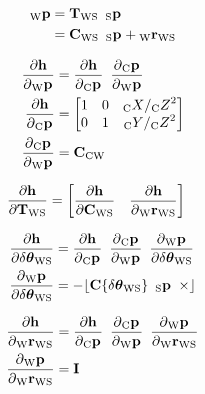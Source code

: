 \begin{align}
  \Point{\world}{\fiducial_{ij}}
  &=
    \Tf{\world}{\sensor}
    \enspace \Pt{\sensor} \\
  &=
    \Rot{\world}{\sensor}
    \enspace \Pt{\sensor}
		+ \Pos{\world}{\sensor}
\end{align}

\begin{align}
  \dfrac{\partial{\projFunc}}{\partial{\Pt{\world}}}
		&= \dfrac{\partial{\projFunc}}{\partial{\Pt{\cam}}}
			 \enspace
			 \dfrac{\partial{\Pt{\cam}}}{\partial{\Pt{\world}}} \\
  \dfrac{\partial{\projFunc}}{\partial{\Pt{\cam}}}
		&=
			\begin{bmatrix}
				1 & 0 & \KineNotationBare{X}{\cam} / \KineNotationBare{Z}{\cam}^{2} \\
				0 & 1 & \KineNotationBare{Y}{\cam} / \KineNotationBare{Z}{\cam}^{2}
			\end{bmatrix} \\
  \dfrac{\partial{\Pt{\cam}}}{\partial{\Pt{\world}}}
		&= \Rot{\cam}{\world}
\end{align}

\begin{align}
  \dfrac{\partial{\projFunc}}{\partial{\Tf{\world}{\sensor}}}
    &=
		\begin{bmatrix}
			\dfrac{\partial{\projFunc}}{\partial{\Rot{\world}{\sensor}}}
			\quad
			\dfrac{\partial{\projFunc}}{\partial{\Pos{\world}{\sensor}}}
		\end{bmatrix}
\end{align}

\begin{align}
  \dfrac{\partial{\projFunc}}{\partial{\dtheta_{\world\sensor}}}
    &= \dfrac{\partial{\projFunc}}{\partial{\Pt{\cam}}}
			 \enspace
       \dfrac{\partial{\Pt{\cam}}}{\partial{\Pt{\world}}}
			 \enspace
       \dfrac{\partial{\Pt{\world}}}{\partial{\dtheta_{\world\sensor}}} \\
	\dfrac{\partial{\Pt{\world}}}{\partial{\dtheta_{\world\sensor}}}
    &= -\Skew{\rot\{\dtheta_{\world\sensor}\} \enspace \Pt{\sensor}}
\end{align}

\begin{align}
  \dfrac{\partial{\projFunc}}{\partial{\Pos{\world}{\sensor}}}
    &= \dfrac{\partial{\projFunc}}{\partial{\Pt{\cam}}}
			 \enspace
       \dfrac{\partial{\Pt{\cam}}}{\partial{\Pt{\world}}}
			 \enspace
       \dfrac{\partial{\Pt{\world}}}{\partial{\Pos{\world}{\sensor}}} \\
	\dfrac{\partial{\Pt{\world}}}{\partial{\Pos{\world}{\sensor}}}
		&= \I
\end{align}


